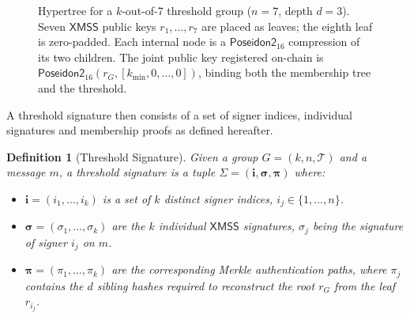 \documentclass[11pt,a4paper]{article}
\newtheorem{definition}{Definition}[section]
\newcommand{\XMSS}{\textsf{XMSS}\xspace}
\newcommand{\hypertree}{\mathcal{T}}
\newcommand{\poseidon}{\textsf{Poseidon2}\xspace}
\begin{document}
\begin{figure}[H]
\centering
{}
\caption{Hypertree for a $k$-out-of-7 threshold group ($n=7$, depth $d=3$). Seven $\XMSS$ public keys $r_1,\ldots,r_7$ are placed as leaves; the eighth leaf is zero-padded.  Each internal node is a $\poseidon_{16}$ compression of its two children.  The joint public key registered on-chain is $\poseidon_{16}(r_G, [k_{\min}, 0,\ldots,0])$, binding both the membership tree and the threshold.}
\label{fig:hypertree}
\end{figure}

\noindent A threshold signature then consists of a set of signer indices, individual signatures and membership proofs as defined hereafter. 

\begin{definition}[Threshold Signature]
  Given a group $G = (k, n, \hypertree)$ and a message $m$, a threshold signature is a tuple $\Sigma = (\mathbf{i}, \boldsymbol{\sigma}, \boldsymbol{\pi})$ where:
  \begin{itemize}
    \item[-] $\mathbf{i} = (i_1, \ldots, i_k)$ is a set of $k$ distinct signer indices, $i_j \in \{1, \ldots, n\}$.
    \item[-] $\boldsymbol{\sigma} = (\sigma_1, \ldots, \sigma_k)$ are the $k$ individual $\XMSS$ signatures, $\sigma_j$ being the signature of signer $i_j$ on $m$.
    \item[-] $\boldsymbol{\pi} = (\pi_1, \ldots, \pi_k)$ are the corresponding Merkle authentication paths, where $\pi_j$ contains the $d$ sibling hashes required to reconstruct the root $r_G$ from the leaf $r_{i_j}$.
  \end{itemize}
\end{definition}
\end{document}
